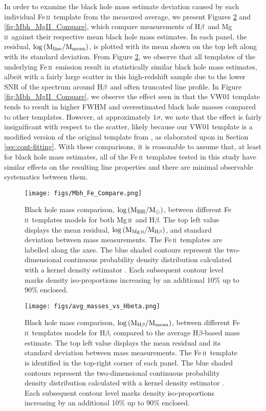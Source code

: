 \documentclass[fleqn,usenatbib]{mnras}
\newcommand{\mgii}{Mg\,\textsc{ii}}
\newcommand{\feii}{Fe\,\textsc{ii}}
\newcommand{\hbeta}{H\textsc{$\beta$}}
\begin{document}
In order to examine the black hole mass estimate deviation caused by each individual \feii\ template from the measured average, we present Figures \ref{fig:Mbh_Hbeta_Compare} and \ref{fig:Mbh_MgII_Compare}, which compare measurements of \hbeta\ and \mgii\ against their respective mean black hole mass estimates. In each panel, the residual, $\log\left(\rm{M_{line}}/\rm{M_{mean}}\right)$, is plotted with its mean shown on the top left along with its standard deviation. From Figure \ref{fig:Mbh_Hbeta_Compare}, we observe that all templates of the underlying \feii\ emission result in statistically similar black hole mass estimates, albeit with a fairly large scatter in this high-redshift sample due to the lower SNR of the spectrum around \hbeta\ and often truncated line profile. In Figure \ref{fig:Mbh_MgII_Compare}, we observe the effect seen in \citet{Schindler_2020} that the VW01 template tends to result in higher FWHM and overestimated black hole masses compared to other templates. However, at approximately $1\sigma$, we note that the effect is fairly insignificant with respect to the scatter, likely because our VW01 template is a modified version of the original template from \citet{Vestergaard_2001}, as elaborated upon in Section \ref{sec:cont-fitting}. With these comparisons, it is reasonable to assume that, at least for black hole mass estimates, all of the \feii\ templates tested in this study have similar effects on the resulting line properties and there are minimal observable systematics between them.

\begin{figure*}
  \texttt{[image: figs/Mbh\_Fe\_Compare.png]}
\caption{Black hole mass comparison, $\log\left(\rm{M_{BH}}/\rm{M_{\odot}}\right)$, between different \feii\ templates models for both \mgii\ and \hbeta. The top left value displays the mean residual, $\log\left(\rm{M_{\mgii}}/\rm{M_{\hbeta}}\right)$, and standard deviation between mass measurements. The \feii\ templates are labelled along the axes. The blue shaded contours represent the two-dimensional continuous probability density distribution calculated with a kernel density estimator \citep{Waskom2021_seaborn}. Each subsequent contour level marks density iso-proportions increasing by an additional 10\% up to 90\% enclosed.} \label{fig:Mbh_Fe_Compare}
\end{figure*}

\begin{figure*}
  \texttt{[image: figs/avg\_masses\_vs\_Hbeta.png]}
\caption{Black hole mass comparison, $\log\left(\rm{M_{\hbeta}}/\rm{M_{mean}}\right)$, between different \feii\ templates models for \hbeta, compared to the average \hbeta-based mass estimate. The top left value displays the mean residual and its standard deviation between mass measurements. The \feii\ template is identified in the top-right corner of each panel. The blue shaded contours represent the two-dimensional continuous probability density distribution calculated with a kernel density estimator \citep{Waskom2021_seaborn}. Each subsequent contour level marks density iso-proportions increasing by an additional 10\% up to 90\% enclosed.} \label{fig:Mbh_Hbeta_Compare}
\end{figure*}
\end{document}
